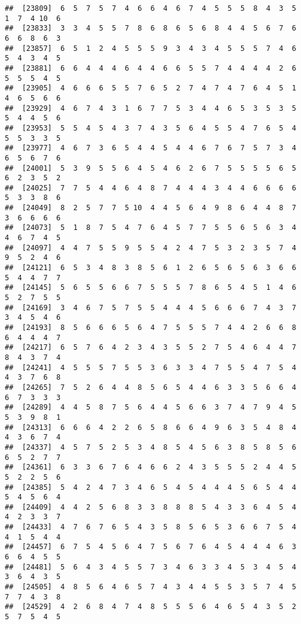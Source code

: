 \documentclass[
]{book}
\begin{document}
\begin{verbatim}
##  [23809]  6  5  7  5  7  4  6  6  4  6  7  4  5  5  5  8  4  3  5  1  7  4 10  6
##  [23833]  3  3  4  5  5  7  8  6  8  6  5  6  8  4  4  5  6  7  6  6  6  8  6  3
##  [23857]  6  5  1  2  4  5  5  5  9  3  4  3  4  5  5  5  7  4  6  5  4  3  4  5
##  [23881]  6  6  4  4  4  6  4  4  6  6  5  5  7  4  4  4  4  2  6  5  5  5  4  5
##  [23905]  4  6  6  6  5  5  7  6  5  2  7  4  7  4  7  6  4  5  1  4  6  5  6  6
##  [23929]  4  6  7  4  3  1  6  7  7  5  3  4  4  6  5  3  5  3  5  5  4  4  5  6
##  [23953]  5  5  4  5  4  3  7  4  3  5  6  4  5  5  4  7  6  5  4  5  5  3  3  5
##  [23977]  4  6  7  3  6  5  4  4  5  4  4  6  7  6  7  5  7  3  4  6  5  6  7  6
##  [24001]  5  3  9  5  5  6  4  5  4  6  2  6  7  5  5  5  5  6  5  6  2  3  5  2
##  [24025]  7  7  5  4  4  6  4  8  7  4  4  4  3  4  4  6  6  6  6  5  3  3  8  6
##  [24049]  8  2  5  7  7  5 10  4  4  5  6  4  9  8  6  4  4  8  7  3  6  6  6  6
##  [24073]  5  1  8  7  5  4  7  6  4  5  7  7  5  5  6  5  6  3  4  4  6  7  4  5
##  [24097]  4  4  7  5  5  9  5  5  4  2  4  7  5  3  2  3  5  7  4  9  5  2  4  6
##  [24121]  6  5  3  4  8  3  8  5  6  1  2  6  5  6  5  6  3  6  6  5  4  4  7  7
##  [24145]  5  6  5  5  6  6  7  5  5  5  7  8  6  5  4  5  1  4  6  5  2  7  5  5
##  [24169]  3  4  6  7  5  7  5  5  4  4  4  5  6  6  6  7  4  3  7  3  4  5  4  6
##  [24193]  8  5  6  6  6  5  6  4  7  5  5  5  7  4  4  2  6  6  8  6  4  4  4  7
##  [24217]  6  5  7  6  4  2  3  4  3  5  5  2  7  5  4  6  4  4  7  8  4  3  7  4
##  [24241]  4  5  5  5  7  5  5  3  6  3  3  4  7  5  5  4  7  5  4  4  3  7  6  8
##  [24265]  7  5  2  6  4  4  8  5  6  5  4  4  6  3  3  5  6  6  4  6  7  3  3  3
##  [24289]  4  4  5  8  7  5  6  4  4  5  6  6  3  7  4  7  9  4  5  5  3  9  8  1
##  [24313]  6  6  6  4  2  2  6  5  8  6  6  4  9  6  3  5  4  8  4  4  3  6  7  4
##  [24337]  4  5  7  5  2  5  3  4  8  5  4  5  6  3  8  5  8  5  6  6  5  2  7  7
##  [24361]  6  3  3  6  7  6  4  6  6  2  4  3  5  5  5  2  4  4  5  5  2  2  5  6
##  [24385]  5  4  2  4  7  3  4  6  5  4  5  4  4  4  5  6  5  4  4  5  4  5  6  4
##  [24409]  4  4  2  5  6  8  3  3  8  8  8  5  4  3  3  6  4  5  4  4  2  3  3  7
##  [24433]  4  7  6  7  6  5  4  3  5  8  5  6  5  3  6  6  7  5  4  4  1  5  4  4
##  [24457]  6  7  5  4  5  6  4  7  5  6  7  6  4  5  4  4  4  6  3  6  6  4  5  5
##  [24481]  5  6  4  3  4  5  5  7  3  4  6  3  3  4  5  3  4  5  4  3  6  4  3  5
##  [24505]  4  8  5  6  4  6  5  7  4  3  4  4  5  5  3  5  7  4  5  7  7  4  3  8
##  [24529]  4  2  6  8  4  7  4  8  5  5  5  6  4  6  5  4  3  5  2  5  7  5  4  5

\end{verbatim}
\end{document}

